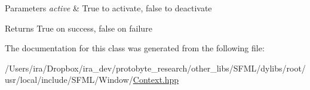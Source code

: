 \begin{DoxyParams}{Parameters}
{\em active} & True to activate, false to deactivate\\
\hline
\end{DoxyParams}
\begin{DoxyReturn}{Returns}
True on success, false on failure 
\end{DoxyReturn}


The documentation for this class was generated from the following file\-:\begin{DoxyCompactItemize}
\item 
/\-Users/ira/\-Dropbox/ira\-\_\-dev/protobyte\-\_\-research/other\-\_\-libs/\-S\-F\-M\-L/dylibs/root/usr/local/include/\-S\-F\-M\-L/\-Window/\hyperlink{_context_8hpp}{Context.\-hpp}\end{DoxyCompactItemize}
